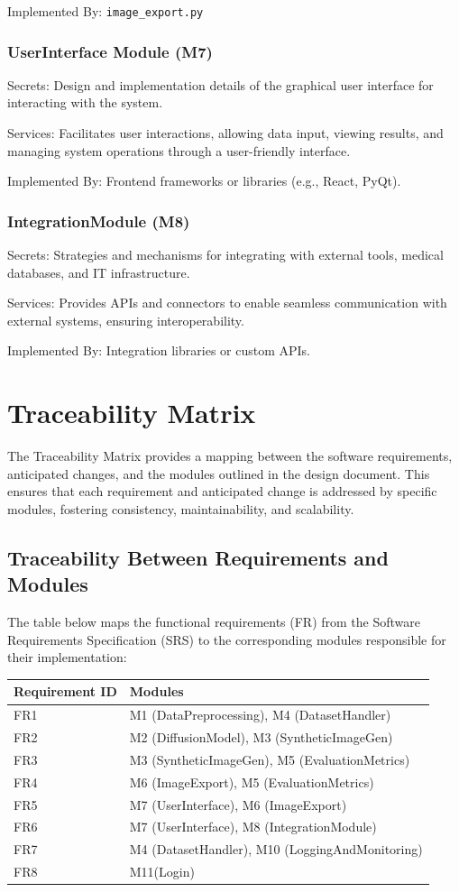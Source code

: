 \documentclass[12pt, titlepage]{article}
\begin{document}
Implemented By: \verb|image_export.py|

\subsubsection{UserInterface Module (M7)}
Secrets: Design and implementation details of the graphical user interface for interacting with the system.

Services: Facilitates user interactions, allowing data input, viewing results, and managing system operations through a user-friendly interface.

Implemented By: Frontend frameworks or libraries (e.g., React, PyQt).

\subsubsection{IntegrationModule (M8)}
Secrets: Strategies and mechanisms for integrating with external tools, medical databases, and IT infrastructure.

Services: Provides APIs and connectors to enable seamless communication with external systems, ensuring interoperability.

Implemented By: Integration libraries or custom APIs.

\section{Traceability Matrix} \label{SecTM}

The Traceability Matrix provides a mapping between the software requirements, anticipated changes, and the modules outlined in the design document. This ensures that each requirement and anticipated change is addressed by specific modules, fostering consistency, maintainability, and scalability.

\subsection{Traceability Between Requirements and Modules}
The table below maps the functional requirements (FR) from the Software Requirements Specification (SRS) to the corresponding modules responsible for their implementation:
\begin{table}[H]
  \begin{tabular}{l|l}
  \textbf{Requirement ID} & \textbf{Modules} \\
  \hline
  FR1 & M1 (DataPreprocessing), M4 (DatasetHandler) \\
  FR2 & M2 (DiffusionModel), M3 (SyntheticImageGen) \\
  FR3 & M3 (SyntheticImageGen), M5 (EvaluationMetrics) \\
  FR4 & M6 (ImageExport), M5 (EvaluationMetrics) \\
  FR5 & M7 (UserInterface), M6 (ImageExport) \\
  FR6 & M7 (UserInterface), M8 (IntegrationModule) \\
  FR7 & M4 (DatasetHandler), M10 (LoggingAndMonitoring) \\
  FR8 & M11(Login)
  \end{tabular}
\end{table}
\end{document}
